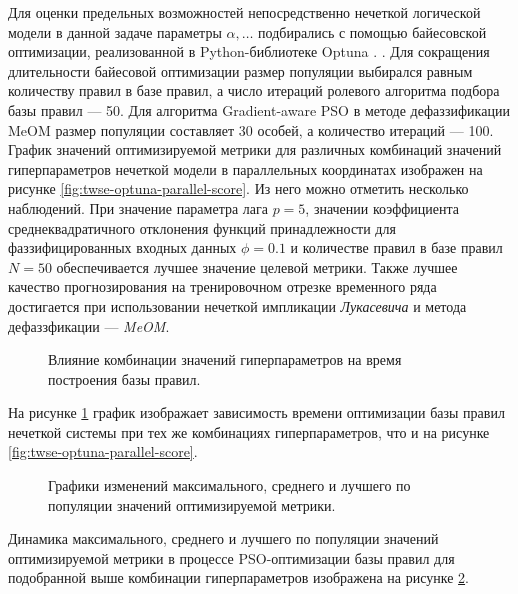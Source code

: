 Для оценки предельных возможностей непосредственно нечеткой логической модели в данной задаче параметры $\alpha,\dots$ подбирались с помощью байесовской оптимизации, реализованной в Python-библиотеке Optuna \cite{Optuna2024, akiba2019optuna}. . Для сокращения длительности байесовой оптимизации размер популяции выбирался равным количеству правил в базе правил, а число итераций ролевого алгоритма подбора базы правил --- 50. Для алгоритма Gradient-aware PSO в методе дефаззификации MeOM размер популяции составляет 30 особей, а количество итераций --- 100. График значений оптимизируемой метрики для различных комбинаций значений гиперпараметров нечеткой модели в параллельных координатах изображен на рисунке \cref{fig:twse-optuna-parallel-score}. Из него можно отметить несколько наблюдений. При значение параметра лага $p = 5$, значении коэффициента среднеквадратичного отклонения функций принадлежности для фаззифицированных входных данных $\phi = 0.1$ и количестве правил в базе правил $N = 50$ обеспечивается лучшее значение целевой метрики. Также лучшее качество прогнозирования на тренировочном отрезке временного ряда достигается при использовании нечеткой импликации \textit{Лукасевича} и метода дефаззфикации --- \textit{MeOM}.

\begin{figure}[hbt] 	
	\label{fig:twse-optuna-parallel-duration}
	\centering
	\caption{Влияние комбинации значений гиперпараметров на время построения базы правил.}
\end{figure}

На рисунке \cref{fig:twse-optuna-parallel-duration} график изображает зависимость времени оптимизации базы правил нечеткой системы при тех же комбинациях гиперпараметров, что и на рисунке \cref{fig:twse-optuna-parallel-score}.

\begin{figure}[hbt] 	
	\label{fig:twse-rules-pso-optimization}
	\centering
	\caption{Графики изменений максимального, среднего и лучшего по популяции значений оптимизируемой метрики.}
\end{figure}

Динамика максимального, среднего и лучшего по популяции значений оптимизируемой метрики в процессе PSO-оптимизации базы правил для подобранной выше комбинации гиперпараметров изображена на рисунке \cref{fig:twse-rules-pso-optimization}.

